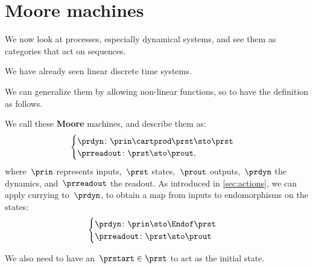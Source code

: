 

\section{Moore machines}
\label{sec:moore-machines}

We now look at processes, especially dynamical systems, and see them as categories that act on sequences.

We have already seen linear discrete time systems.

We can generalize them by allowing non-linear functions, so to have the definition as follows.

We call these \textbf{Moore} machines, and describe them as:
%
\begin{equation}
    \label{eq:moore-1}
    \begin{cases}
        \prdyn \colon \prin \cartprod \prst \sto \prst \\
        \prreadout \colon \prst \sto \prout,
    \end{cases}
\end{equation}
%
where~$\prin$ represents inputs,~$\prst$ states,~$\prout$ outputs,~$\prdyn$ the dynamics, and~$\prreadout$ the readout.
As introduced in \cref{sec:actions}, we can apply currying to~$\prdyn$, to obtain a map from inputs to endomorphisms on the states:
%
\begin{equation}
    \label{eq:moore-1-endo}
    \begin{cases}
        \prdyn \colon \prin \sto \Endof \prst \\
        \prreadout \colon \prst \sto \prout
    \end{cases}
\end{equation}
%

We also need to have an~$\prstart \in \prst$ to act as the initial state.

